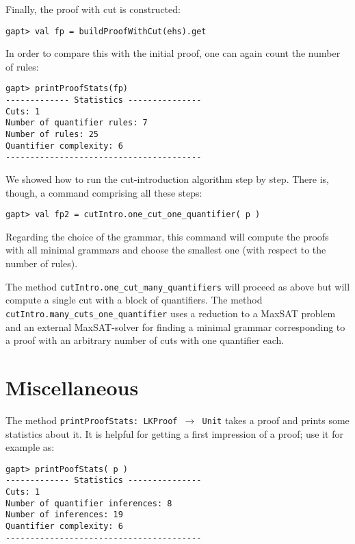 \documentclass[a4paper,11pt]{article}
\begin{document}
Finally, the proof with cut is constructed:
\begin{lstlisting}
gapt> val fp = buildProofWithCut(ehs).get
\end{lstlisting}
In order to compare this with the initial proof, one can again count
the number of rules:
\begin{lstlisting}
gapt> printProofStats(fp)
------------- Statistics ---------------
Cuts: 1
Number of quantifier rules: 7
Number of rules: 25
Quantifier complexity: 6
----------------------------------------
\end{lstlisting}
We showed how to run the cut-introduction algorithm step by step. There is,
though, a command comprising all these steps:
\begin{lstlisting}
gapt> val fp2 = cutIntro.one_cut_one_quantifier( p )
\end{lstlisting}
Regarding the choice of the grammar, this command will compute the proofs with
all minimal grammars and choose the smallest one (with respect to the number of rules).

The method \texttt{cutIntro.one\_cut\_many\_quantifiers} will proceed as above but will
compute a single cut with a block of quantifiers. The method \texttt{cutIntro.many\_cuts\_one\_quantifier}
uses a reduction to a MaxSAT problem and an external MaxSAT-solver for finding a
minimal grammar corresponding to a proof with an arbitrary number of cuts with one quantifier each.

\section{Miscellaneous}

The method \texttt{printProofStats: LKProof $\rightarrow$ Unit}
takes a proof and prints some statistics about it. It is helpful
for getting a first impression of a proof; use it for example as:

\begin{lstlisting}
gapt> printPoofStats( p )
------------- Statistics ---------------
Cuts: 1
Number of quantifier inferences: 8
Number of inferences: 19
Quantifier complexity: 6
----------------------------------------
\end{lstlisting}
\end{document}
